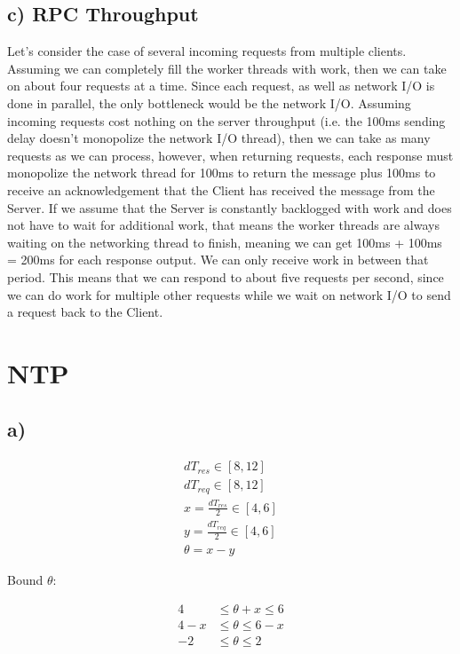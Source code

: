 \documentclass[12pt]{article}
\begin{document}
\subsection*{c) RPC Throughput}
Let's consider the case of several incoming requests from multiple clients. Assuming we can completely fill the worker threads with work, then we can take on about four requests at a time. Since each request, as well as network I/O is done in parallel, the only bottleneck would be the network I/O. Assuming incoming requests cost nothing on the server throughput (i.e. the 100ms sending delay doesn't monopolize the network I/O thread), then we can take as many requests as we can process, however, when returning requests, each response must monopolize the network thread for 100ms to return the message plus 100ms to receive an acknowledgement that the Client has received the message from the Server. If we assume that the Server is constantly backlogged with work and does not have to wait for additional work, that means the worker threads are always waiting on the networking thread to finish, meaning we can get 100ms + 100ms = 200ms for each response output. We can only receive work in between that period. This means that we can respond to about five requests per second, since we can do work for multiple other requests while we wait on network I/O to send a request back to the Client.
\section{NTP}

\subsection*{a)}

\begin{align*}
    dT_{res} \in \left[8, 12 \right] \\
    dT_{req} \in \left[8, 12 \right] \\    
    x = \frac{dT_{res}}{2} \in \left[4, 6 \right] \\
    y = \frac{dT_{req}}{2} \in \left[4, 6 \right]\\
    \theta = x - y
\end{align*}

Bound $\theta$:

\begin{align*}
    4 &\le \theta + x \le 6 \\
    4-x &\le \theta \le 6 - x \\
    -2 &\le \theta \le 2 \\
\end{align*}
\end{document}
